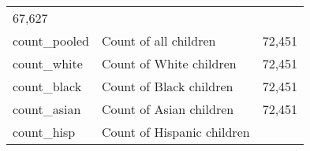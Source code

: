 \documentclass[]{book}
\begin{document}
\begin{longtable}[]{@{}lll@{}}
\begin{minipage}[t]{0.04\columnwidth}
67,627\strut
\end{minipage}\tabularnewline
\begin{minipage}[t]{0.04\columnwidth}\raggedright\strut
count\_pooled\strut
\end{minipage} & \begin{minipage}[t]{0.04\columnwidth}\raggedright\strut
Count of all children\strut
\end{minipage} & \begin{minipage}[t]{0.04\columnwidth}\raggedright\strut
72,451\strut
\end{minipage}\tabularnewline
\begin{minipage}[t]{0.04\columnwidth}\raggedright\strut
count\_white\strut
\end{minipage} & \begin{minipage}[t]{0.04\columnwidth}\raggedright\strut
Count of White children\strut
\end{minipage} & \begin{minipage}[t]{0.04\columnwidth}\raggedright\strut
72,451\strut
\end{minipage}\tabularnewline
\begin{minipage}[t]{0.04\columnwidth}\raggedright\strut
count\_black\strut
\end{minipage} & \begin{minipage}[t]{0.04\columnwidth}\raggedright\strut
Count of Black children\strut
\end{minipage} & \begin{minipage}[t]{0.04\columnwidth}\raggedright\strut
72,451\strut
\end{minipage}\tabularnewline
\begin{minipage}[t]{0.04\columnwidth}\raggedright\strut
count\_asian\strut
\end{minipage} & \begin{minipage}[t]{0.04\columnwidth}\raggedright\strut
Count of Asian children\strut
\end{minipage} & \begin{minipage}[t]{0.04\columnwidth}\raggedright\strut
72,451\strut
\end{minipage}\tabularnewline
\begin{minipage}[t]{0.04\columnwidth}\raggedright\strut
count\_hisp\strut
\end{minipage} & \begin{minipage}[t]{0.04\columnwidth}\raggedright\strut
Count of Hispanic children\strut
\end{minipage} & \begin{minipage}[t]{0.04\columnwidth}\raggedright\strut

\end{minipage}
\end{longtable}
\end{document}

